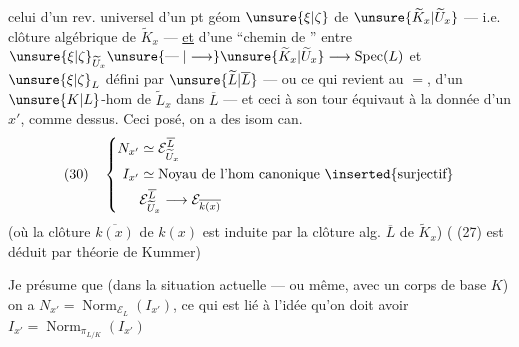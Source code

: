 celui d'un rev. universel   d'un pt géom $\unsure{\xi|\zeta}$ de $\unsure{\widetilde K_x|\widetilde U_x}$ --- i.e.  clôture algébrique de $\widetilde K_x$ --- \uline{et} d'une  ``chemin de '' entre $\unsure{\xi|\zeta}_{\widetilde U_x}\unsure{\mathrel{\text{---}}|\longrightarrow}\unsure{\widetilde K_x|\widetilde U_x}\longrightarrow\operatorname{Spec}(L)$ et $\unsure{\xi|\zeta}_L$ défini par $\unsure{\widetilde L|\overline L}$ --- ou ce qui revient au $=$,  d'un $\unsure{K|L}$-hom de   $\widetilde L_x$ dans $\overline L$ --- et ceci à son tour équivaut à la donnée d'un $x'$,  comme dessus. Ceci posé, on a des isom can.
\[
(30)\quad\left\{\begin{aligned}
N_{x'}&\simeq\mathcal E_{\widetilde U_x}^{\overline L}\\
I_{x'}&\simeq\text{Noyau de l'hom canonique }\inserted{\text{surjectif}}\\
&\mathcal E_{\widetilde U_x}^{\overline L}\longrightarrow\mathcal E_{\overline{k(x)}}
\end{aligned}\right.
\]
(où la clôture  $\overline{k(x)}$ de $k(x)$ est induite par la clôture alg. $\overline L$ de $\widetilde K_x$)
( (27) est déduit par théorie de Kummer)

Je présume que (dans la situation actuelle --- ou même, avec un corps de base $K$) on a $N_{x'}=\operatorname{Norm}_{\mathcal E_L}(I_{x'})$,  ce qui est lié à l'idée qu'on doit avoir $I_{x'}=\operatorname{Norm}_{\pi_{L/K}}(I_{x'})$
